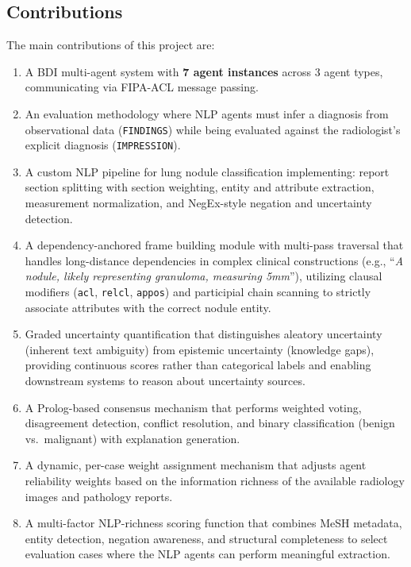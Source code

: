 \documentclass[12pt]{article}
\begin{document}
\subsection{Contributions}
\label{subsec:contributions}

The main contributions of this project are:

\begin{enumerate}
    \item A BDI multi-agent system with \textbf{7 agent instances} across 3 agent types, communicating via FIPA-ACL message passing.
    \item An evaluation methodology where NLP agents must infer a diagnosis from observational data (\texttt{FINDINGS}) while being evaluated against the radiologist's explicit diagnosis (\texttt{IMPRESSION}).
    \item A custom NLP pipeline for lung nodule classification implementing: report section splitting with section weighting, entity and attribute extraction, measurement normalization, and NegEx-style negation and uncertainty detection.
    \item A dependency-anchored frame building module with multi-pass traversal that handles long-distance dependencies in complex clinical constructions (e.g., ``\textit{A nodule, likely representing granuloma, measuring 5mm}''), utilizing clausal modifiers (\texttt{acl}, \texttt{relcl}, \texttt{appos}) and participial chain scanning to strictly associate attributes with the correct nodule entity.
    \item Graded uncertainty quantification that distinguishes aleatory uncertainty (inherent text ambiguity) from epistemic uncertainty (knowledge gaps), providing continuous scores rather than categorical labels and enabling downstream systems to reason about uncertainty sources.
    \item A Prolog-based consensus mechanism that performs weighted voting, disagreement detection, conflict resolution, and binary classification (benign vs.\ malignant) with explanation generation.
    \item A dynamic, per-case weight assignment mechanism that adjusts agent reliability weights based on the information richness of the available radiology images and pathology reports.
    \item A multi-factor NLP-richness scoring function that combines MeSH metadata, entity detection, negation awareness, and structural completeness to select evaluation cases where the NLP agents can perform meaningful extraction.

\end{enumerate}
\end{document}
